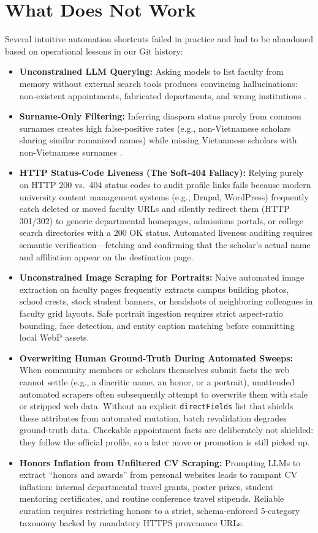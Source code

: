 \documentclass[11pt]{article}
\newcommand{\code}[1]{\texttt{\small #1}}
\begin{document}
\section{What Does Not Work}
\label{sec:whatdoesnotwork}
Several intuitive automation shortcuts failed in practice and had to be abandoned based on operational lessons in our Git history:
\begin{itemize}
\item \textbf{Unconstrained LLM Querying:} Asking models to list faculty from memory without external search tools produces convincing hallucinations: non-existent appointments, fabricated departments, and wrong institutions \cite{ji2023survey}.
\item \textbf{Surname-Only Filtering:} Inferring diaspora status purely from common surnames creates high false-positive rates (e.g., non-Vietnamese scholars sharing similar romanized names) while missing Vietnamese scholars with non-Vietnamese surnames \cite{mateos2007name}.
\item \textbf{HTTP Status-Code Liveness (The Soft-404 Fallacy):} Relying purely on HTTP 200 vs.\ 404 status codes to audit profile links fails because modern university content management systems (e.g., Drupal, WordPress) frequently catch deleted or moved faculty URLs and silently redirect them (HTTP 301/302) to generic departmental homepages, admissions portals, or college search directories with a 200 OK status. Automated liveness auditing requires semantic verification---fetching and confirming that the scholar's actual name and affiliation appear on the destination page.
\item \textbf{Unconstrained Image Scraping for Portraits:} Naive automated image extraction on faculty pages frequently extracts campus building photos, school crests, stock student banners, or headshots of neighboring colleagues in faculty grid layouts. Safe portrait ingestion requires strict aspect-ratio bounding, face detection, and entity caption matching before committing local WebP assets.
\item \textbf{Overwriting Human Ground-Truth During Automated Sweeps:} When community members or scholars themselves submit facts the web cannot settle (e.g., a diacritic name, an honor, or a portrait), unattended automated scrapers often subsequently attempt to overwrite them with stale or stripped web data. Without an explicit \code{directFields} list that shields these attributes from automated mutation, batch revalidation degrades ground-truth data. Checkable appointment facts are deliberately not shielded: they follow the official profile, so a later move or promotion is still picked up.
\item \textbf{Honors Inflation from Unfiltered CV Scraping:} Prompting LLMs to extract ``honors and awards'' from personal websites leads to rampant CV inflation: internal departmental travel grants, poster prizes, student mentoring certificates, and routine conference travel stipends. Reliable curation requires restricting honors to a strict, schema-enforced 5-category taxonomy backed by mandatory HTTPS provenance URLs.
\end{itemize}
\end{document}
